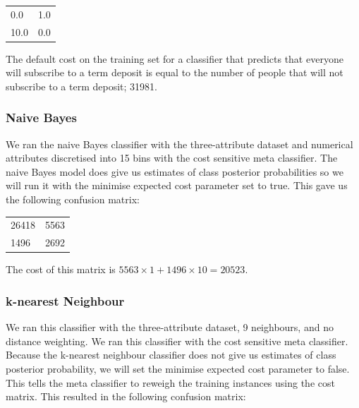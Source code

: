 \documentclass[a4paper,11pt]{article}
\begin{document}
\begin{table}[H]
  \begin{center}
    \begin{tabular}{l l }
      0.0 & 1.0 \\
      10.0 & 0.0 \\
    \end{tabular}
  \end{center}
  \label{tab:costMatrixStructure}
\end{table}

The default cost on the training set for a classifier that predicts that everyone will subscribe to a term deposit is equal
to the number of people that will not subscribe to a term deposit; 31981.

\subsubsection{Naive Bayes}

We ran the naive Bayes classifier with the three-attribute dataset and numerical attributes discretised into 15 bins
with the cost sensitive meta classifier. The naive Bayes model does give us estimates of class posterior
probabilities so we will run it with the minimise expected cost parameter set to true. This gave us the 
following confusion matrix:

\begin{table}[H]
  \begin{center}
    \begin{tabular}{l l }
      26418 & 5563 \\
      1496 & 2692 \\
    \end{tabular}
  \end{center}
  \label{tab:naiveBayesCost}
\end{table}

The cost of this matrix is $ 5563 \times 1 + 1496 \times 10 = 20523 $.

\subsubsection{k-nearest Neighbour}

We ran this classifier with the three-attribute dataset, 9 neighbours, and no distance weighting. We ran this
classifier with the cost sensitive meta classifier. Because the k-nearest neighbour classifier does not give us
estimates of class posterior probability, we will set the minimise expected cost parameter to false. This tells
the meta classifier to reweigh the training instances using the cost matrix. This resulted in the following
confusion matrix:
\end{document}

